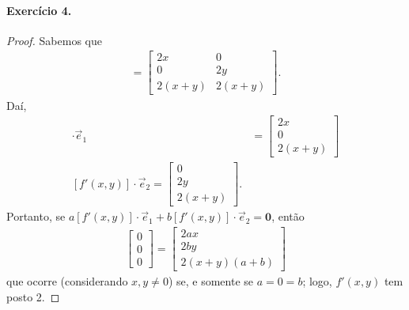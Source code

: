 \documentclass[12pt,a4paper]{article}
\begin{document}
\paragraph{Exercício 4.}
    \begin{proof}
        Sabemos que
        \begin{align*}
            [f'(x,y)] = 
            \begin{bmatrix}
                2x & 0 \\
                0 & 2y \\
                2(x+y) & 2(x+y)
            \end{bmatrix}.
        \end{align*}
        Daí,
        \begin{align*}
            [f'(x,y)]\cdot\vec{e}_1 &= 
            \begin{bmatrix}
                2x \\ 
                0 \\
                2(x+y)
            \end{bmatrix} \\
            [f'(x,y)]\cdot\vec{e}_2 = 
            \begin{bmatrix}
                0 \\ 
                2y \\
                2(x+y)
            \end{bmatrix}.
        \end{align*}
        Portanto, se $a[f'(x,y)]\cdot\vec{e}_1 + b[f'(x,y)]\cdot\vec{e}_2 = \mathbf{0}$, então
        \begin{align*}
            \begin{bmatrix}
                0 \\
                0 \\
                0
            \end{bmatrix}
            =
            \begin{bmatrix}
                2ax \\
                2by \\
                2(x+y)(a+b)
            \end{bmatrix}
        \end{align*}
        que ocorre (considerando $x,y\neq 0$) se, e somente se $a=0=b$; logo, $f'(x,y)$ tem posto 2.
    \end{proof}
\end{document}
